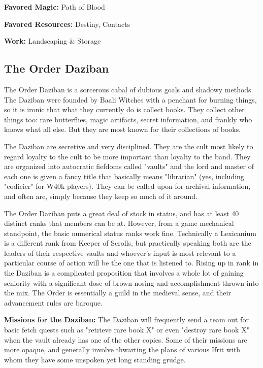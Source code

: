 \textbf{Favored Magic:}  Path of Blood

\textbf{Favored Resources:} Destiny, Contacts

\textbf{Work:} Landscaping \& Storage

\subsection{The Order Daziban} 

The Order Daziban is a sorcerous cabal of dubious goals and shadowy methods. The Daziban were founded by Baali Witches with a penchant for burning things, so it is ironic that what they currently do is collect books. They collect other things too: rare butterflies, magic artifacts, secret information, and frankly who knows what all else. But they are most known for their collections of books.

The Daziban are secretive and very disciplined. They are the cult most likely to regard loyalty to the cult to be more important than loyalty to the band. They are organized into autocratic fiefdoms called "vaults" and the lord and master of each one is given a fancy title that basically means "librarian" (yes, including "codicier" for W40k players). They can be called upon for archival information, and often are, simply because they keep so much of it around.

The Order Daziban puts a great deal of stock in status, and has at least 40 distinct ranks that members can be at. However, from a game mechanical standpoint, the basic numerical status ranks work fine. Technically a Lexicanium is a different rank from Keeper of Scrolls, but practically speaking both are the leaders of their respective vaults and whoever's input is most relevant to a particular course of action will be the one that is listened to. Rising up in rank in the Daziban is a complicated proposition that involves a whole lot of gaining seniority with a significant dose of brown nosing and accomplishment thrown into the mix. The Order is essentially a guild in the medieval sense, and their advancement rules are baroque.

\textbf{Missions for the Daziban:} The Daziban will frequently send a team out for basic fetch quests such as "retrieve rare book X" or even "destroy rare book X" when the vault already has one of the other copies. Some of their missions are more opaque, and generally involve thwarting the plans of various Ifrit with whom they have some unspoken yet long standing grudge.

